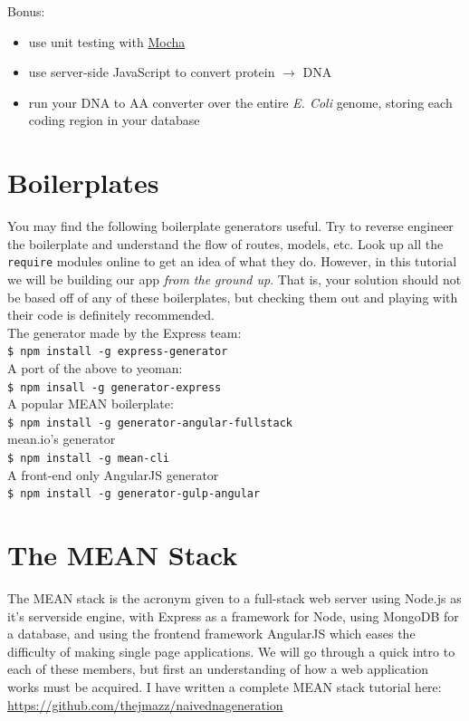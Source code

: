\noindent Bonus:
\begin{itemize}
    \item use unit testing with \href{http://mochajs.org/}{Mocha}
    \item use server-side JavaScript to convert protein $\rightarrow$ DNA
    \item run your DNA to AA converter over the entire \textit{E. Coli} genome,
        storing each coding region in your database
\end{itemize}

\section{Boilerplates}

You may find the following boilerplate generators useful. Try to reverse
engineer the boilerplate and understand the flow of routes, models, etc.
Look up all the \texttt{require} modules online to get an idea of what they
do. However, in this tutorial we will be building our app \textit{from the
ground up}. That is, your solution should not be based off of any of these
boilerplates, but checking them out and playing with their code is definitely
recommended. \\

\noindent The generator made by the Express team: \\
\texttt{\$ npm install -g express-generator} \\ 
A port of the above to yeoman: \\
\texttt{\$ npm insall -g generator-express} \\
A popular MEAN boilerplate: \\
\texttt{\$ npm install -g generator-angular-fullstack} \\
mean.io's generator \\
\texttt{\$ npm install -g mean-cli} \\
A front-end only AngularJS generator \\
\texttt{\$ npm install -g generator-gulp-angular}

\section{The MEAN Stack}

The MEAN stack is the acronym given to a full-stack web server using Node.js as
it's serverside engine, with Express as a framework for Node, using MongoDB for
a database, and using the frontend framework AngularJS which eases the 
difficulty of making single page applications. We will go through a quick intro
to each of these members, but first an understanding of how a web application
works must be acquired. I have written a complete MEAN stack tutorial here:
\href{https://github.com/thejmazz/naivednageneration}{https://github.com/thejmazz/naivednageneration}

